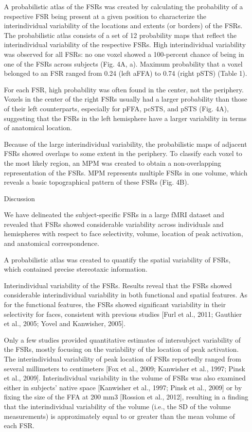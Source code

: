 A probabilistic atlas of the FSRs was created by calculating the probability of
a respective FSR being present at a given position to characterize the
interindividual variability of the locations and extents (or borders) of the
FSRs.
%
The probabilistic atlas consists of a set of 12 probability maps that reflect
the interindividual variability of the respective FSRs.
%
High interindividual variability was observed for all FSRs: no one voxel showed
a 100-percent chance of being in one of the FSRs across subjects (Fig. 4A, a).
%
Maximum probability that a voxel belonged to an FSR ranged from 0.24 (left aFFA)
to 0.74 (right pSTS) (Table 1).


For each FSR, high probability was often found in the center, not the periphery.
%
Voxels in the center of the right FSRs usually had a larger probability than
those of their left counterparts, especially for pFFA, pcSTS, and pSTS (Fig.
4A), suggesting that the FSRs in the left hemisphere have a larger variability
in terms of anatomical location.

%
Because of the large interindividual variability, the probabilistic maps of
adjacent FSRs showed overlaps to some extent in the periphery.
%
To classify each voxel to the most likely region, an MPM was created to obtain a
non-overlapping representation of the FSRs.
%
MPM represents multiple FSRs in one volume, which reveals a basic topographical
pattern of these FSRs (Fig. 4B).


Discussion

We have delineated the subject-specific FSRs in a large fMRI dataset and
revealed that FSRs showed considerable variability across individuals and
hemispheres with respect to face selectivity, volume, location of peak
activation, and anatomical correspondence.

%
A probabilistic atlas was created to quantify the spatial variability
of FSRs, which contained precise stereotaxic information.


Interindividual variability of the FSRs.
%
Results reveal that the FSRs showed considerable interindividual variability
in both functional and spatial features.
%
As for the functional features, the FSRs showed significant variability in their
selectivity for faces, consistent with previous studies [Furl et al., 2011;
Gauthier et al., 2005; Yovel and Kanwisher, 2005].

%
Only a few studies provided quantitative estimates of intersubject variability
of the FSRs, mostly focusing on the variability of the location of peak
activation.
%
The interindividual variability of peak location of FSRs reportedly ranged from
several millimeters to centimeters [Fox et al., 2009; Kanwisher et al., 1997;
Pinsk et al., 2009].
%
Interindividual variability in the volume of FSRs was also
examined either in subjects' native space [Kanwisher et al., 1997; Pinsk et al.,
2009] or by fixing the size of the FFA at 200 mm3 [Rossion et al., 2012],
resulting in a finding that the interindividual variability of the volume (i.e.,
the SD of the volume measurements) is approximately equal to or greater than the
mean volume of each FSR.

